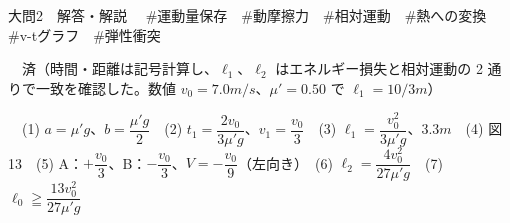 \documentclass[paper=b5, fontsize=8pt, fleqn, twoside]{jlreq}
\begin{document}
\begin{ascolorbox4A}[75点・30分]{大問2　解答・解説}
　\#運動量保存　\#動摩擦力　\#相対運動　\#熱への変換　\#v-tグラフ　\#弾性衝突\par
{}　済（時間・距離は記号計算し、$\ell_1$、$\ell_2$ はエネルギー損失と相対運動の 2 通りで一致を確認した。数値 $v_0=7.0\unit{m/s}$、$\mu'=0.50$ で $\ell_1=10/3\unit{m}$）\par
{}　(1) $a=\mu'g$、$b=\dfrac{\mu'g}{2}$　(2) $t_1=\dfrac{2v_0}{3\mu'g}$、$v_1=\dfrac{v_0}{3}$　(3) $\ell_1=\dfrac{v_0^2}{3\mu'g}$、$3.3\unit{m}$　(4) 図 13　(5) A：$+\dfrac{v_0}{3}$、B：$-\dfrac{v_0}{3}$、$V=-\dfrac{v_0}{9}$（左向き）　(6) $\ell_2=\dfrac{4v_0^2}{27\mu'g}$　(7) $\ell_0\geqq\dfrac{13v_0^2}{27\mu'g}$
\end{ascolorbox4A}
\end{document}
